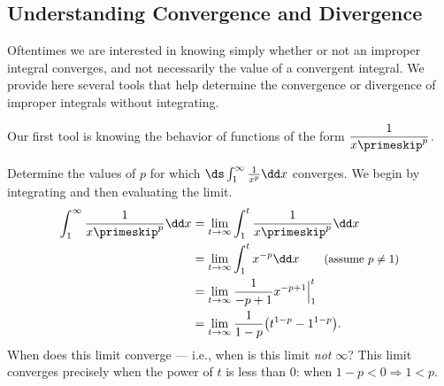 \subsection{Understanding Convergence and Divergence}

Oftentimes we are interested in knowing simply whether or not an improper integral converges, and not necessarily the value of a convergent integral. We provide here several tools that help determine the convergence or divergence of improper integrals without integrating.

Our first tool is knowing the behavior of functions of the form $\dfrac1{x\primeskip^p}$.

\begin{example}\label{ex_impint4}
Determine the values of $p$ for which $\ds \int_1^\infty \frac1{x^p}\dd x$ converges.
\solution
We begin by integrating and then evaluating the limit.
\begin{align*}
	\int_1^\infty \frac1{x\primeskip^p}\dd x
	&= \lim_{t\to\infty}\int_1^t\frac1{x\primeskip^p}\dd x\\
	&= \lim_{t\to\infty}\int_1^t x^{-p}\dd x \qquad \text{\small (assume $p\neq 1$)}\\
	&= \lim_{t\to\infty} \frac{1}{-p+1}x^{-p+1}\Big|_1^t\\
	&= \lim_{t\to\infty} \frac{1}{1-p}\bigl(t^{1-p}-1^{1-p}\bigr).\\
\end{align*}
%
%
%
When does this limit converge --- i.e., when is this limit \emph{not} $\infty$? This limit converges precisely when the power of $t$ is less than 0: when $1-p<0 \Rightarrow 1<p$. 


\end{example}
